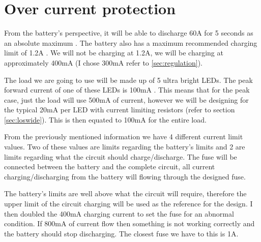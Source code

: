 \newpage
\section{Over current protection}
From the battery's perspective, it will be able to discharge 60A for 5 seconds as an absolute maximum \cite{RS}. The battery also has a maximum recommended charging limit of 1.2A \cite{RS}. We will not be charging at 1.2A, we will be charging at approximately 400mA (I chose 300mA refer to \ref{sec:regulation}).

The load we are going to use will be made up of 5 ultra bright LEDs. The peak forward current of one of these LEDs is 100mA \cite{LED}. This means that for the peak case, just the load will use 500mA of current, however we will be designing for the typical 20mA per LED with current limiting resistors (refer to section \ref{sec:loswide}). This is then equated to 100mA for the entire load.

From the previously mentioned information we have 4 different current limit values. Two of these values are limits regarding the battery's limits and 2 are limits regarding what the circuit should charge/discharge. The fuse will be connected between the battery and the complete circuit, all current charging/discharging from the battery will flowing through the designed fuse.

The battery's limits are well above what the circuit will require, therefore the upper limit of the circuit charging will be used as the reference for the design. I then doubled the 400mA charging current to set the fuse for an abnormal condition. If 800mA of current flow then something is not working correctly and the battery should stop discharging. The closest fuse we have to this is 1A. 

\newpage
